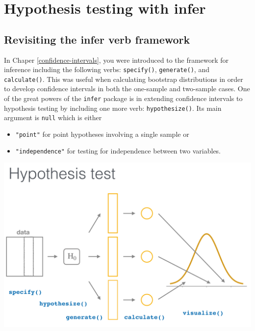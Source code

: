 \documentclass[12pt, krantz2,]{krantz}
\providecommand{\tightlist}{%
  \setlength{\itemsep}{0pt}\setlength{\parskip}{0pt}}
\begin{document}
\hypertarget{ht-infer}{%
\section{Hypothesis testing with infer}\label{ht-infer}}

\hypertarget{revisiting-the-infer-verb-framework}{%
\subsection{Revisiting the infer verb framework}\label{revisiting-the-infer-verb-framework}}

In Chaper \ref{confidence-intervals}, you were introduced to the framework for inference including the following verbs: \texttt{specify()}, \texttt{generate()}, and \texttt{calculate()}. This was useful when calculating bootstrap distributions in order to develop confidence intervals in both the one-sample and two-sample cases. One of the great powers of the \texttt{infer} package is in extending confidence intervals to hypothesis testing by including one more verb: \texttt{hypothesize()}. Its main argument is \texttt{null} which is either

\begin{itemize}
\tightlist
\item
  \texttt{"point"} for point hypotheses involving a single sample or
\item
  \texttt{"independence"} for testing for independence between two variables.
\end{itemize}

\begin{center}\includegraphics[width=\textwidth]{images/flowcharts/infer/ht} \end{center}
\end{document}
